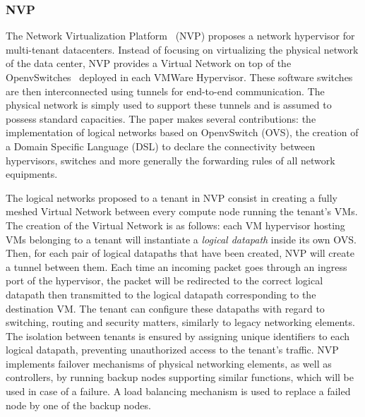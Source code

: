 \subsubsection{NVP}
The Network Virtualization Platform~\cite{NVP-Koponen2014} (NVP) proposes a network hypervisor for multi-tenant datacenters. Instead of focusing on virtualizing the physical network of the data center, NVP provides a Virtual Network on top of the OpenvSwitches~\cite{openvswitch} deployed in each VMWare Hypervisor. These software switches are then interconnected using tunnels for end-to-end communication. 
The physical network is simply used to support these tunnels and is assumed to possess standard capacities.
The paper makes several contributions: the implementation of logical networks based on OpenvSwitch (OVS), the creation of a Domain Specific Language (DSL) to declare the connectivity between hypervisors, switches and more generally the forwarding rules of all network equipments.

The logical networks proposed to a tenant in NVP consist in creating a fully meshed Virtual Network between every compute node running the tenant's VMs.
The creation of the Virtual Network is as follows:
each VM hypervisor hosting VMs belonging to a tenant will instantiate a \textit{logical datapath} inside its own OVS. 
Then, for each pair of logical datapaths that have been created, NVP will create a tunnel between them.
Each time an incoming packet goes through an ingress port of the hypervisor, the packet will be redirected to the correct logical datapath then transmitted to the logical datapath corresponding to the destination VM.
The tenant can configure these datapaths with regard to switching, routing and security matters, similarly to legacy networking elements.
The isolation between tenants is ensured by assigning unique identifiers to each logical datapath, preventing unauthorized access to the tenant's traffic.
NVP implements failover mechanisms of physical networking elements, as well as controllers, by running backup nodes supporting similar functions, which will be used in case of a failure.
A load balancing mechanism is used to replace a failed node by one of the backup nodes.

